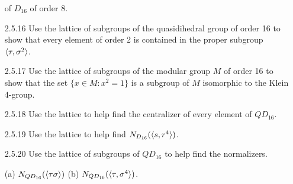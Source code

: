 \begin{enumerate}
                  of $D_{16}$ of order 8.
   \item[2.5.16]  Use the lattice of subgroups of the quasidihedral group of
                  order 16 to show that every element of order 2 is contained in
                  the proper subgroup $\langle \tau, \sigma^2 \rangle$.
   \item[2.5.17]  Use the lattice of subgroups of the modular group $M$ of order
                  16 to show that the set $\{x \in M : x^2 = 1\}$ is a subgroup
                  of $M$ isomorphic to the Klein 4-group.
   \item[2.5.18]  Use the lattice to help find the centralizer of every element
                  of $QD_{16}$.
   \item[2.5.19]  Use the lattice to help find $N_{D_{16}}(\langle s, r^4 \rangle)$.
   \item[2.5.20]  Use the lattice of subgroups of $QD_{16}$ to help find the
                  normalizers.

                  (a) $N_{QD_{16}}(\langle \tau\sigma \rangle)$ \qquad
                  (b) $N_{QD_{16}}(\langle \tau, \sigma^4 \rangle)$.
\end{enumerate}
